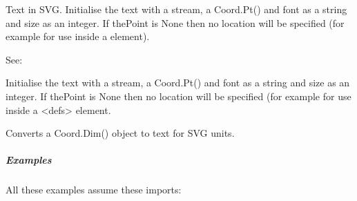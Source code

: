 \documentclass[letterpaper,10pt,english]{sphinxmanual}
\begin{document}

\begin{fulllineitems}
\label{\detokenize{ref/util/plot/SVGWriter:TotalDepth.util.plot.SVGWriter.SVGText}}
Text in SVG. Initialise the text with a stream, a Coord.Pt() and font 
as a string and size as an integer.
If thePoint is None then no location will be specified (for example
for use inside a  element).

See: 

\begin{fulllineitems}
\label{\detokenize{ref/util/plot/SVGWriter:TotalDepth.util.plot.SVGWriter.SVGText.__init__}}
Initialise the text with a stream, a Coord.Pt() and font 
as a string and size as an integer.
If thePoint is None then no location will be specified (for example
for use inside a \textless{}defs\textgreater{} element.

\end{fulllineitems}


\end{fulllineitems}


\begin{fulllineitems}
\label{\detokenize{ref/util/plot/SVGWriter:TotalDepth.util.plot.SVGWriter.dimToTxt}}
Converts a Coord.Dim() object to text for SVG units.

\end{fulllineitems}



\subparagraph{Examples}
\label{\detokenize{ref/util/plot/SVGWriter:examples}}
All these examples assume these imports:

\begin{sphinxVerbatim}[commandchars=\\\{\}]
 
   
   
   
\end{sphinxVerbatim}
\end{document}
